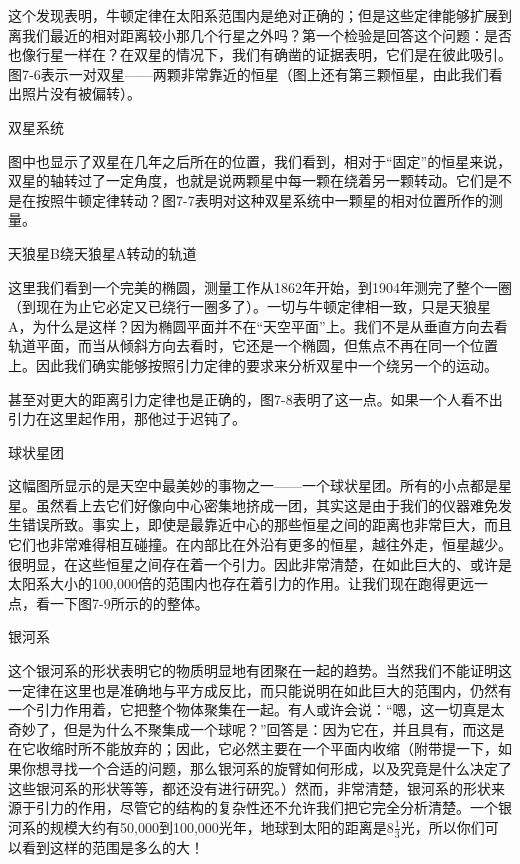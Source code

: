 \documentclass[12pt,oneside]{book}
\begin{document}
这个发现表明，牛顿定律在太阳系范围内是绝对正确的；但是这些定律能够扩展到离我们最近的相对距离较小那几个行星之外吗？第一个检验是回答这个问题：是否也像行星一样在？在双星的情况下，我们有确凿的证据表明，它们是在彼此吸引。图7-6表示一对双星——两颗非常靠近的恒星（图上还有第三颗恒星，由此我们看出照片没有被偏转）。
\begin{linefig}{双星系统}
\caption{双星系统}
\label{fig:双星系统}
\end{linefig}
图中也显示了双星在几年之后所在的位置，我们看到，相对于“固定”的恒星来说，双星的轴转过了一定角度，也就是说两颗星中每一颗在绕着另一颗转动。它们是不是在按照牛顿定律转动？图7-7表明对这种双星系统中一颗星的相对位置所作的测量。
\begin{fig}{天狼星B绕天狼星A转动的轨道}
\caption{天狼星B绕天狼星A转动的轨道}
\label{fig:天狼星B绕天狼星A转动的轨道}
\end{fig}
这里我们看到一个完美的椭圆，测量工作从1862年开始，到1904年测完了整个一圈（到现在为止它必定又已绕行一圈多了）。一切与牛顿定律相一致，只是天狼星A，为什么是这样？因为椭圆平面并不在“天空平面”上。我们不是从垂直方向去看轨道平面，而当从倾斜方向去看时，它还是一个椭圆，但焦点不再在同一个位置上。因此我们确实能够按照引力定律的要求来分析双星中一个绕另一个的运动。

甚至对更大的距离引力定律也是正确的，图7-8表明了这一点。如果一个人看不出引力在这里起作用，那他过于迟钝了。
\begin{linefig}{球状星团}
\caption{球状星团}
\label{fig:球状星团}
\end{linefig}
这幅图所显示的是天空中最美妙的事物之一——一个球状星团。所有的小点都是星星。虽然看上去它们好像向中心密集地挤成一团，其实这是由于我们的仪器难免发生错误所致。事实上，即使是最靠近中心的那些恒星之间的距离也非常巨大，而且它们也非常难得相互碰撞。在内部比在外沿有更多的恒星，越往外走，恒星越少。很明显，在这些恒星之间存在着一个引力。因此非常清楚，在如此巨大的、或许是太阳系大小的100,000倍的范围内也存在着引力的作用。让我们现在跑得更远一点，看一下图7-9所示的的整体。
\begin{linefig}{银河系}
\caption{银河系}
\label{fig:银河系}
\end{linefig}
这个银河系的形状表明它的物质明显地有团聚在一起的趋势。当然我们不能证明这一定律在这里也是准确地与平方成反比，而只能说明在如此巨大的范围内，仍然有一个引力作用着，它把整个物体聚集在一起。有人或许会说：“嗯，这一切真是太奇妙了，但是为什么不聚集成一个球呢？”回答是：因为它在，并且具有，而这是在它收缩时所不能放弃的；因此，它必然主要在一个平面内收缩（附带提一下，如果你想寻找一个合适的问题，那么银河系的旋臂如何形成，以及究竟是什么决定了这些银河系的形状等等，都还没有进行研究。）然而，非常清楚，银河系的形状来源于引力的作用，尽管它的结构的复杂性还不允许我们把它完全分析清楚。一个银河系的规模大约有50,000到100,000光年，地球到太阳的距离是$8\frac{1}{3}$光，所以你们可以看到这样的范围是多么的大！
\end{document}
